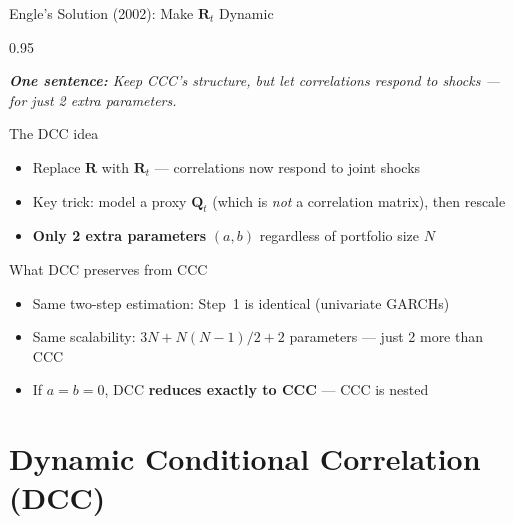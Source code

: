 \documentclass[9pt, aspectratio=169, t]{beamer}
\begin{document}
\begin{frame}{Engle's Solution (2002): Make $\mathbf{R}_t$ Dynamic}
    \begin{cminipage}{0.95\textwidth}
    {\footnotesize
    \textit{\textbf{One sentence:} Keep CCC's structure, but let correlations respond to shocks --- for just 2 extra parameters.}
    \vspace{0.2cm}
    \begin{block}{The DCC idea}
        \begin{itemize}\setlength{\itemsep}{2pt}
            \item Replace $\mathbf{R}$ with $\mathbf{R}_t$ --- correlations now respond to joint shocks
            \item Key trick: model a proxy $\mathbf{Q}_t$ (which is \textit{not} a correlation matrix), then rescale
            \item \textbf{Only 2 extra parameters} $(a, b)$ regardless of portfolio size $N$
        \end{itemize}
    \end{block}
    \vspace{0.1cm}
    \begin{exampleblock}{What DCC preserves from CCC}
        \begin{itemize}\setlength{\itemsep}{0pt}
            \item Same two-step estimation: Step~1 is identical (univariate GARCHs)
            \item Same scalability: $3N + N(N-1)/2 + 2$ parameters --- just 2 more than CCC
            \item If $a = b = 0$, DCC \textbf{reduces exactly to CCC} --- CCC is nested
        \end{itemize}
    \end{exampleblock}
    }
    \end{cminipage}
\end{frame}

\section{Dynamic Conditional Correlation (DCC)}
\end{document}
